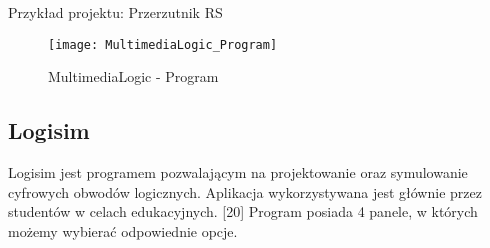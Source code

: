 \documentclass[12pt, a4paper, onside, polish]{article}				%
\begin{document}
Przykład projektu: Przerzutnik RS
  	\begin{figure}[H]
  	  {\centering \texttt{[image: MultimediaLogic\_Program]} \caption{MultimediaLogic - Program}}\vspace{5mm}
  	 \end{figure}
\cleardoublepage

\subsection{Logisim}
\hspace{\parindent}
Logisim jest programem pozwalającym na projektowanie oraz symulowanie cyfrowych obwodów logicznych. Aplikacja wykorzystywana jest głównie przez studentów w celach edukacyjnych. [20]  \newline\newline
Program posiada 4 panele, w których możemy wybierać odpowiednie opcje.
\end{document}
